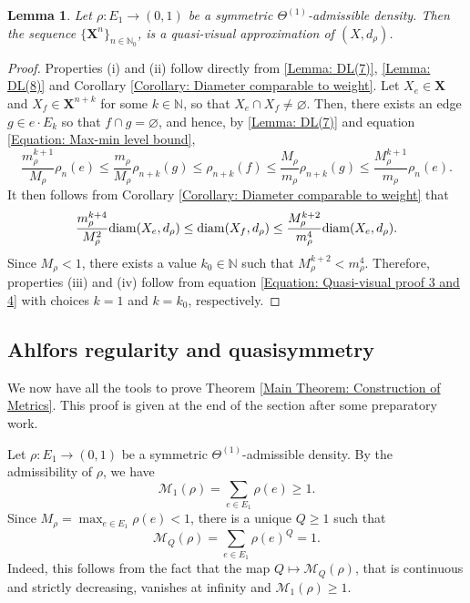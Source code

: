 \documentclass{amsart}
\newcommand{\diam}{{\rm diam}}
\newtheorem{lemma}[equation]{Lemma}
\numberwithin{equation}{section}
\theoremstyle{definition}
\theoremstyle{remark}
\newcommand{\N}{\mathbb{N}}
\newcommand{\cM}{\mathcal{M}}
\begin{document}
\begin{lemma}\label{Lemma: quasi-visual approximation}
    Let \(\rho\colon E_1\to (0,1)\) be a symmetric \(\Theta^{(1)}\)-admissible density. Then the sequence \(\{\mathbf{X}^n\}_{n\in\N_0}\), is a quasi-visual approximation of \((X,d_\rho)\).
\end{lemma}
\begin{proof}
    Properties (i) and (ii) follow directly from \ref{Lemma: DL(7)}, \ref{Lemma: DL(8)} and Corollary \ref{Corollary: Diameter comparable to weight}. Let \(X_e\in \mathbf{X}\) and \(X_f\in \mathbf{X}^{n+k}\) for some \(k\in \N\), so that \(X_e\cap X_f\neq\varnothing\). Then, there exists an edge \(g\in e\cdot E_k\) so that \(f\cap g=\varnothing\), and hence, by \ref{Lemma: DL(7)} and equation \eqref{Equation: Max-min level bound},
        \begin{equation}
            \frac{m_\rho^{k+1}}{M_\rho}\rho_n(e)\leq\frac{m_\rho}{M_\rho}\rho_{n+k}(g)\leq\rho_{n+k}(f)\leq\frac{M_\rho}{m_\rho}\rho_{n+k}(g)\leq \frac{M_\rho^{k+1}}{m_\rho}\rho_n(e).
        \end{equation}
    It then follows from Corollary \ref{Corollary: Diameter comparable to weight} that
        \begin{equation}\label{Equation: Quasi-visual proof 3 and 4}
            \frac{m_\rho^{k+4}}{M_\rho^2}\diam(X_e,d_\rho)\leq\diam(X_f,d_\rho)\leq\frac{M_\rho^{k+2}}{m_\rho^4}\diam(X_e,d_\rho).
        \end{equation}
    Since \(M_\rho<1\), there exists a value \(k_0\in \N\) such that \(M_\rho^{k+2}<m_\rho^4\). Therefore, properties (iii) and (iv) follow from equation \eqref{Equation: Quasi-visual proof 3 and 4} with choices \(k=1\) and \(k=k_0\), respectively.
\end{proof}


\subsection{Ahlfors regularity and quasisymmetry}
We now have all the tools to prove Theorem \ref{Main Theorem: Construction of Metrics}. This proof is given at the end of the section after some preparatory work.

Let $\rho:E_1\to (0,1)$ be a symmetric \(\Theta^{(1)}\)-admissible density. By the admissibility of $\rho$, we have
\[
    \mathcal{M}_1(\rho) = \sum_{e \in E_1} \rho(e) \geq 1.
\]
Since $M_\rho = \max_{e \in E_1} \rho(e) < 1$, there is a unique $Q \geq 1$ such that
        \[
            \cM_Q(\rho)=\sum_{e\in E_1}\rho(e)^Q=1.
        \]
        Indeed, this follows from the fact that the map $Q \mapsto \mathcal{M}_Q(\rho)$, that is continuous and strictly decreasing, vanishes at infinity and $\mathcal{M}_1(\rho) \geq 1$.
        
\end{document}
